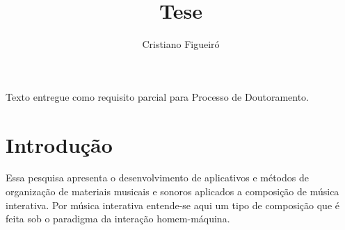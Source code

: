 \documentclass{ppgmus}
\begin{document}
 


\capa
\begin{dadosTese}
Texto entregue como requisito parcial para Processo de Doutoramento.
\end{dadosTese}


\title{Tese}
\author{Cristiano Figueiró}



\tableofcontents

\newpage

%  
% 
% 
% 
% 
% 

\chapter{Introdução}
\label{sec:intro}


Essa pesquisa apresenta o desenvolvimento de aplicativos e métodos
de organização de materiais musicais e sonoros aplicados a composição
de música interativa. Por música interativa entende-se aqui um tipo
de composição que é feita sob o paradigma da interação homem-máquina.
\end{document}

